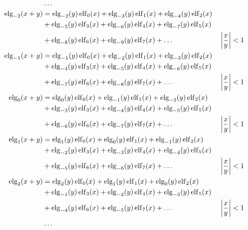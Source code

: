 \begin{equation*} \begin{aligned}
&\ldots \\
%
\elg_{-2}(x + y) &=   
  \elg_{-2}(y) \elf_0(x)
+ \elg_{-3}(y) \elf_1(x)  
+ \elg_{-4}(y) \elf_2(x) \\ &
+ \elg_{-5}(y) \elf_3(x)
+ \elg_{-6}(y) \elf_4(x)
+ \elg_{-7}(y) \elf_5(x) \\ &
+ \elg_{-8}(y) \elf_6(x)
+ \elg_{-9}(y) \elf_7(x)
+ \ldots & 
&\left| \frac{x}{y} \right| < 1 \\
%
\elg_{-1}(x + y) &=
  \elg_{-1}(y) \elf_0(x)
+ \elg_{-2}(y) \elf_1(x)  
+ \elg_{-3}(y) \elf_2(x) \\ &
+ \elg_{-4}(y) \elf_3(x)
+ \elg_{-5}(y) \elf_4(x)
+ \elg_{-6}(y) \elf_5(x) \\ &
+ \elg_{-7}(y) \elf_6(x)
+ \elg_{-8}(y) \elf_7(x)
+ \ldots & 
&\left| \frac{x}{y} \right| < 1 \\
%
\elg_0(x + y) &=
  \elg_0(y) \elf_0(x)
+ \elg_{-1}(y) \elf_1(x)  
+ \elg_{-2}(y) \elf_2(x) \\ &
+ \elg_{-3}(y) \elf_3(x)
+ \elg_{-4}(y) \elf_4(x)
+ \elg_{-5}(y) \elf_5(x) \\ &
+ \elg_{-6}(y) \elf_6(x)
+ \elg_{-7}(y) \elf_7(x)
+ \ldots & 
&\left| \frac{x}{y} \right| < 1 \\
%
\elg_1(x + y) &=
  \elg_1(y) \elf_0(x)
+ \elg_0(y) \elf_1(x)
+ \elg_{-1}(y) \elf_2(x) \\ &
+ \elg_{-2}(y) \elf_3(x)
+ \elg_{-3}(y) \elf_4(x)
+ \elg_{-4}(y) \elf_5(x) \\ &
+ \elg_{-5}(y) \elf_6(x)
+ \elg_{-6}(y) \elf_7(x)
+ \ldots & 
&\left| \frac{x}{y} \right| < 1 \\
%
\elg_2(x + y) &=
  \elg_2(y) \elf_0(x)
+ \elg_1(y) \elf_1(x)
+ \elg_0(y) \elf_2(x) \\ &
+ \elg_{-1}(y) \elf_3(x)
+ \elg_{-2}(y) \elf_4(x)
+ \elg_{-3}(y) \elf_5(x) \\ &
+ \elg_{-4}(y) \elf_6(x)
+ \elg_{-5}(y) \elf_7(x)
+ \ldots & 
&\left| \frac{x}{y} \right| < 1 \\
%
&\ldots \\
\end{aligned} \end{equation*}